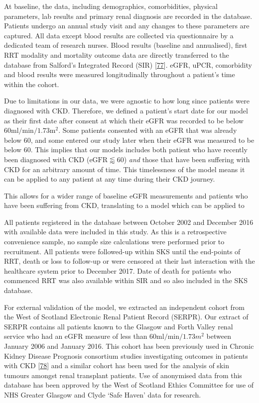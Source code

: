 \documentclass[12pt,PhD,twoside,openright]{muthesis}
\begin{document}
At baseline, the data, including demographics, comorbidities, physical parameters, lab results and primary renal diagnosis are recorded in the database. Patients undergo an annual study visit and any changes to these parameters are captured. All data except blood results are collected via questionnaire by a dedicated team of research nurses. Blood results (baseline and annualised), first RRT modality and mortality outcome data are directly transferred to the database from Salford's Integrated Record (SIR) {[}\protect\hyperlink{ref-new_obtaining_2014}{77}{]}. eGFR, uPCR, comorbidity and blood results were measured longitudinally throughout a patient's time within the cohort.

Due to limitations in our data, we were agnostic to how long since patients were diagnosed with CKD. Therefore, we defined a patient's start date for our model as their first date after consent at which their eGFR was recorded to be below \(60\textrm{ml}/\textrm{min}/1.73\textrm{m}^2\). Some patients consented with an eGFR that was already below 60, and some entered our study later when their eGFR was measured to be below 60. This implies that our models includes both patient who have recently been diagnosed with CKD (\(\textrm{eGFR} \lessapprox 60\)) \emph{and} those that have been suffering with CKD for an arbitrary amount of time. This timelessness of the model means it can be applied to any patient at any time during their CKD journey.

This allows for a wider range of baseline eGFR measurements and patients who have been suffering from CKD, translating to a model which can be applied to

All patients registered in the database between October 2002 and December 2016 with available data were included in this study. As this is a retrospective convenience sample, no sample size calculations were performed prior to recruitment. All patients were followed-up within SKS until the end-points of RRT, death or loss to follow-up or were censored at their last interaction with the healthcare system prior to December 2017. Date of death for patients who commenced RRT was also available within SIR and so also included in the SKS database.

For external validation of the model, we extracted an independent cohort from the West of Scotland Electronic Renal Patient Record (SERPR). Our extract of SERPR contains all patients known to the Glasgow and Forth Valley renal service who had an eGFR measure of less than \(60\textrm{ml}/\textrm{min}/1.73m^2\) between January 2006 and January 2016. This cohort has been previously used in Chronic Kidney Disease Prognosis consortium studies investigating outcomes in patients with CKD {[}\protect\hyperlink{ref-matsushita_cohort_2013}{78}{]} and a similar cohort has been used for the analysis of skin tumours amongst renal transplant patients. Use of anonymised data from this database has been approved by the West of Scotland Ethics Committee for use of NHS Greater Glasgow and Clyde `Safe Haven' data for research.
\end{document}
